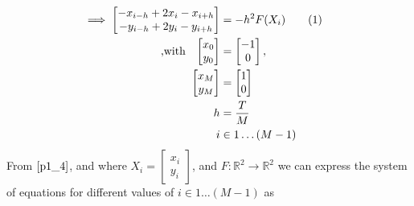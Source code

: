\documentclass[twoside,12pt]{article}
\newcommand\numberthis{\addtocounter{equation}{1}\tag{\theequation}}
\begin{document}
\begin{align*}
\\\\
\implies \begin{bmatrix}-x_{i-h}+2 x_i -x_{i+h}\\-y_{i-h}+2 y_i -y_{i+h}
 \end{bmatrix} &=  - h^2 F(X_i)\numberthis\label{p1_4}\\
\text{,with}\;\;\;\begin{bmatrix}x_{0}\\y_{0}\end{bmatrix}&=\begin{bmatrix}-1\\0\end{bmatrix},\\
\begin{bmatrix}x_{M}\\y_{M}\end{bmatrix}&=\begin{bmatrix}1\\0\end{bmatrix}\\
h &= \frac{T}{M}\\
i &\in 1\dots(M-1)\\
\end{align*}
From $\eqref{p1_4}$,  and where $X_i= \begin{bmatrix}x_i\\y_i\end{bmatrix}$, and $F\colon \mathbb{R}^2\to\mathbb{R}^2$ we can express the system of equations for different values of $i \in 1\dots(M-1)$ as
\end{document}
